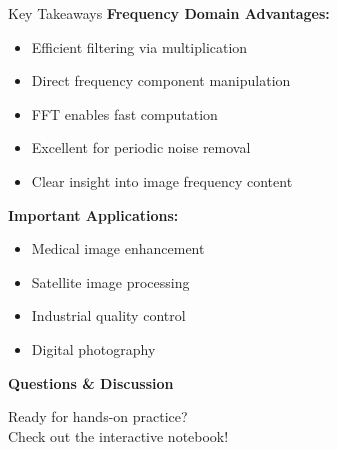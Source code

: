 \documentclass[aspectratio=169,10pt]{beamer}
\begin{document}
\begin{frame}{Key Takeaways}
\textbf{Frequency Domain Advantages:}
\begin{itemize}
\item Efficient filtering via multiplication
\item Direct frequency component manipulation
\item FFT enables fast computation
\item Excellent for periodic noise removal
\item Clear insight into image frequency content
\end{itemize}

\textbf{Important Applications:}
\begin{itemize}
\item Medical image enhancement
\item Satellite image processing
\item Industrial quality control
\item Digital photography
\end{itemize}
\end{frame}

\begin{frame}[standout]
\Large
\textbf{Questions \& Discussion}

\vspace{1cm}
\normalsize
Ready for hands-on practice?\\
Check out the interactive notebook!
\end{frame}
\end{document}

